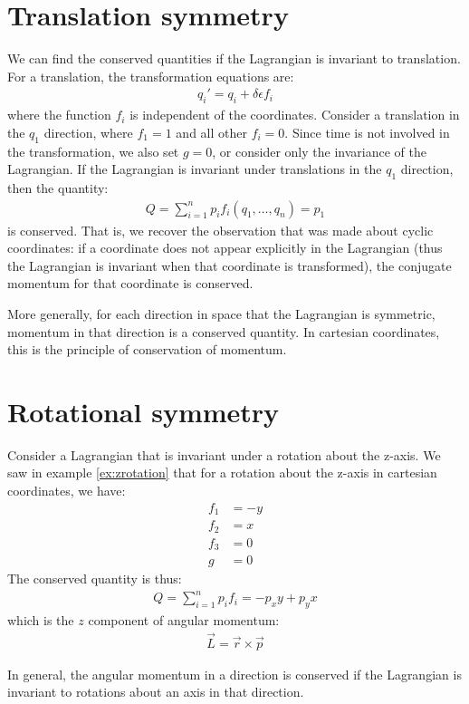\section{Translation symmetry}
We can find the conserved quantities if the Lagrangian is invariant to translation. For a translation, the transformation equations are:
\begin{align}
q_i'=q_i+\delta \epsilon f_i
\end{align}
where the function $f_i$ is independent of the coordinates. Consider a translation in the $q_1$ direction, where $f_1=1$ and all other $f_i=0$. Since time is not involved in the transformation, we also set $g=0$, or consider only the invariance of the Lagrangian. If the Lagrangian is invariant under translations in the $q_1$ direction, then the quantity:
\begin{align}
Q=\sum_{i=1}^np_if_i(q_1,\dots ,q_n)=p_1
\end{align}
is conserved. That is, we recover the observation that was made about cyclic coordinates: if a coordinate does not appear explicitly in the Lagrangian (thus the Lagrangian is invariant when that coordinate is transformed), the conjugate momentum for that coordinate is conserved.

More generally, for each direction in space that the Lagrangian is symmetric, momentum in that direction is a conserved quantity. In cartesian coordinates, this is the principle of conservation of momentum.

\section{Rotational symmetry}
Consider a Lagrangian that is invariant under a rotation about the z-axis. We saw in example \ref{ex:zrotation} that for a rotation about the z-axis in cartesian coordinates, we have:
\begin{align}
f_1&=-y\\
f_2&=x\\
f_3&=0\\
g&=0
\end{align}
The conserved quantity is thus:
\begin{align}
Q=\sum_{i=1}^np_if_i=-p_xy+p_yx
\end{align}
which is the $z$ component of angular momentum:
\begin{align}
\vec{L}=\vec{r}\times\vec{p}
\end{align}

In general, the angular momentum in a direction is conserved if the Lagrangian is invariant to rotations about an axis in that direction.

